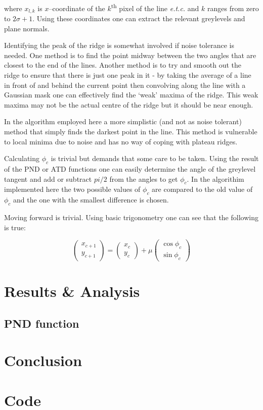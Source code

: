 \documentclass[11pt,a4paper]{article}
\begin{document}
\begin{multicols}{2}
		where $x_{l,k}$ is $x$--coordinate of the $k$\textsuperscript{th} pixel of the line \textit{e.t.c.} and $k$ ranges from zero to $2 \sigma + 1$. Using these coordinates one can extract the relevant greylevels and plane normals.

		Identifying the peak of the ridge is somewhat involved if noise tolerance is needed. One method is to find the point midway between the two angles that are closest to the end of the lines. Another method is to try and smooth out the ridge to ensure that there is just one peak in it - by taking the average of a line in front of and behind the current point then convolving along the line with a Gaussian mask one can effectively find the `weak' maxima of the ridge. This weak maxima may not be the actual centre of the ridge but it should be near enough.

In the algorithm employed here a more simplistic (and not as noise tolerant) method that simply finds the darkest point in the line. This method is vulnerable to local minima due to noise and has no way of coping with plateau ridges.

		Calculating $\phi_c$ is trivial but demands that some care to be taken. Using the result of the PND or ATD functions one can easily determine the angle of the greylevel tangent and add or subtract $pi/2$ from the angles to get $\phi_c$. In the algorithim implemented here the two possible values of $\phi_c$ are compared to the old value of $\phi_c$ and the one with the smallest difference is chosen.

		Moving forward is trivial. Using basic trigonometry one can see that the following is true:

		\begin{equation}
			\begin{pmatrix}
			x_{c+1} \\
			y_{c+1}
			\end{pmatrix}
			=
			\begin{pmatrix}
			x_c \\
			y_c
			\end{pmatrix}
			+ \mu
			\begin{pmatrix}
			\cos{\phi_c} \\
			\sin{\phi_c}
			\end{pmatrix}
		\end{equation}

\section{Results \& Analysis}

	\subsection{PND function}

\section{Conclusion}


\printbibliography
\end{multicols}

\appendix
\section{Code}
	
\end{document}
